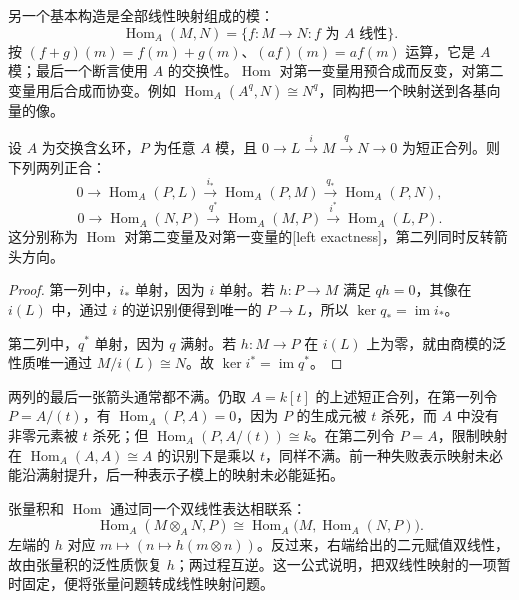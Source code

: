 另一个基本构造是全部线性映射组成的模：
\[
	\operatorname{Hom}_A(M,N)
	=\{f:M\rightarrow N:f\text{ 为 }A\text{ 线性}\}.
\]
按 \((f+g)(m)=f(m)+g(m)\)、\((af)(m)=af(m)\) 运算，它是 \(A\) 模；最后一个断言使用 \(A\) 的交换性。\(\operatorname{Hom}\) 对第一变量用预合成而反变，对第二变量用后合成而协变。例如 \(\operatorname{Hom}_A(A^q,N)\cong N^q\)，同构把一个映射送到各基向量的像。

\begin{proposition}\label{g5:prop:hom-left-exact}
	设 \(A\) 为交换含幺环，\(P\) 为任意 \(A\) 模，且
	\(0\rightarrow L\xrightarrow{i}M\xrightarrow{q}N\rightarrow0\) 为短正合列。则下列两列正合：
	\[
		0\longrightarrow\operatorname{Hom}_A(P,L)
		\xrightarrow{i_*}\operatorname{Hom}_A(P,M)
		\xrightarrow{q_*}\operatorname{Hom}_A(P,N),
	\]
	\[
		0\longrightarrow\operatorname{Hom}_A(N,P)
		\xrightarrow{q^*}\operatorname{Hom}_A(M,P)
		\xrightarrow{i^*}\operatorname{Hom}_A(L,P).
	\]
	这分别称为 \(\operatorname{Hom}\) 对第二变量及对第一变量的[left exactness]，第二列同时反转箭头方向。
\end{proposition}
\begin{proof}
	第一列中，\(i_*\) 单射，因为 \(i\) 单射。若 \(h:P\rightarrow M\) 满足 \(qh=0\)，其像在 \(i(L)\) 中，通过 \(i\) 的逆识别便得到唯一的 \(P\rightarrow L\)，所以 \(\ker q_*=\operatorname{im}i_*\)。

	第二列中，\(q^*\) 单射，因为 \(q\) 满射。若 \(h:M\rightarrow P\) 在 \(i(L)\) 上为零，就由商模的泛性质唯一通过 \(M/i(L)\cong N\)。故 \(\ker i^*=\operatorname{im}q^*\)。
\end{proof}

两列的最后一张箭头通常都不满。仍取 \(A=k[t]\) 的上述短正合列，在第一列令 \(P=A/(t)\)，有 \(\operatorname{Hom}_A(P,A)=0\)，因为 \(P\) 的生成元被 \(t\) 杀死，而 \(A\) 中没有非零元素被 \(t\) 杀死；但 \(\operatorname{Hom}_A(P,A/(t))\cong k\)。在第二列令 \(P=A\)，限制映射在 \(\operatorname{Hom}_A(A,A)\cong A\) 的识别下是乘以 \(t\)，同样不满。前一种失败表示映射未必能沿满射提升，后一种表示子模上的映射未必能延拓。

\ProseParagraphBreak

张量积和 \(\operatorname{Hom}\) 通过同一个双线性表达相联系：
\[
	\operatorname{Hom}_A(M\otimes_A N,P)
	\cong\operatorname{Hom}_A\bigl(M,\operatorname{Hom}_A(N,P)\bigr).
\]
左端的 \(h\) 对应 \(m\mapsto(n\mapsto h(m\otimes n))\)。反过来，右端给出的二元赋值双线性，故由张量积的泛性质恢复 \(h\)；两过程互逆。这一公式说明，把双线性映射的一项暂时固定，便将张量问题转成线性映射问题。

